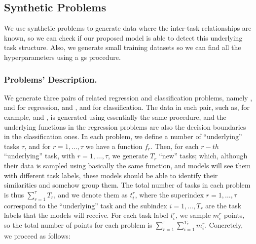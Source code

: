 \subsection{Synthetic Problems}
%
We use synthetic problems to generate data where the inter-task relationships are known, so we can check if our proposed model is able to detect this underlying task structure.
%
Also, we generate small training datasets so we can find all the hyperparameters using a \acrshort{gs} procedure.

\subsubsection*{Problems' Description.}
We generate three pairs of related regression and classification problems, namely ,  and  for regression, and ,  and  for classification.
The data in each pair, such as, for example,  and , is generated using essentially the same procedure, and the underlying functions in the regression problems are also the decision boundaries in the classification ones.
%
In each problem, we define a number of ``underlying'' tasks $\tau$, and for $r=1, \ldots, \tau$ we have a function $f_r$.
Then, for each $r-th$ ``underlying'' task, with $r=1, \ldots, \tau$, we generate $T_r$ ``new'' tasks; which, although their data is sampled using basically the same function, and models will see them with different task labels, these models should be able to identify their similarities and somehow group them.
%
The total number of tasks in each problem is thus $\sum_{r=1}^{\tau} T_r$, and we denote them as $t_i^r$, where the superindex $r=1, \ldots, \tau$ correspond to the ``underlying'' task and the subindex $i=1, \ldots, T_r$ are the task labels that the models will receive.
%
For each task label $t_i^r$, we sample $m_i^r$ points, so the total number of points for each problem is $\sum_{r=1}^\tau \sum_{i=1}^{T_r} m_i^r$.
%
Concretely, we proceed as follows:
